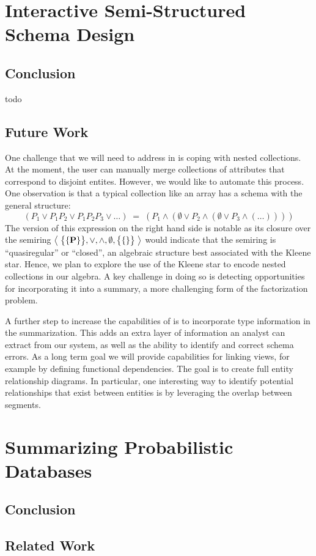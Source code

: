 \section{Interactive Semi-Structured Schema Design}
\subsection{Conclusion}
todo
\subsection{Future Work}
One challenge that we will need to address in \systemnametwo is coping with nested collections.  
At the moment, the user can manually merge collections of attributes that correspond to disjoint entites.
However, we would like to automate this process.
One observation is that a typical collection like an array has a schema with the general structure:
$$(P_1 \vee P_1P_2 \vee P_1P_2P_3 \vee \ldots)\;=\;(P_1 \wedge (\emptyset \vee P_2 \wedge (\emptyset \vee P_3 \wedge (\ldots)) ))$$
The version of this expression on the right hand side is notable as its closure over the semiring $\left<\;{\big\{\{\mathbf P\}\big\}, \vee, \wedge, \emptyset, \big\{\{\}\big\}}\;\right>$ would indicate that the semiring is ``quasiregular'' or ``closed'', an algebraic structure best associated with the Kleene star.
Hence, we plan to explore the use of the Kleene star to encode nested collections in our algebra.
A key challenge in doing so is detecting opportunities for incorporating it into a summary, a more challenging form of the factorization problem.

A further step to increase the capabilities of \systemnametwo is to incorporate type information in the summarization. 
This adds an extra layer of information an analyst can extract from our system, as well as the ability to identify and correct schema errors. 
As a long term goal we will provide capabilities for linking views, for example by defining functional dependencies.
The goal is to create full entity relationship diagrams. 
In particular, one interesting way to identify potential relationships that exist between entities is by leveraging the overlap between segments.

\section{Summarizing Probabilistic Databases}
\subsection{Conclusion}
\subsection{Related Work}